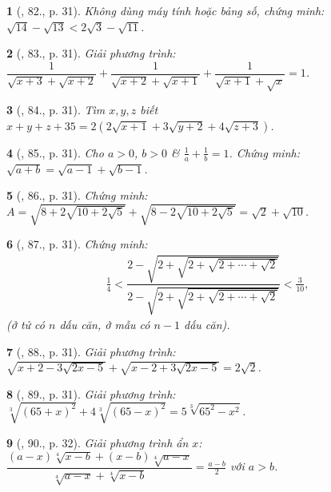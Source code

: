 \documentclass{article}
\newtheorem{baitoan}{}
\begin{document}
\begin{baitoan}[\cite{Tuyen_Toan_9_old}, 82., p. 31]
	Không dùng máy tính hoặc bảng số, chứng minh: $\sqrt{14} - \sqrt{13} < 2\sqrt{3} - \sqrt{11}$.
\end{baitoan}

\begin{baitoan}[\cite{Tuyen_Toan_9_old}, 83., p. 31]
	Giải phương trình: $\dfrac{1}{\sqrt{x + 3} + \sqrt{x + 2}} + \dfrac{1}{\sqrt{x + 2} + \sqrt{x + 1}} + \dfrac{1}{\sqrt{x + 1} + \sqrt{x}} = 1$. 
\end{baitoan}

\begin{baitoan}[\cite{Tuyen_Toan_9_old}, 84., p. 31]
	Tìm $x,y,z$ biết $x + y + z + 35 = 2(2\sqrt{x + 1} + 3\sqrt{y + 2} +4\sqrt{z + 3})$.
\end{baitoan}

\begin{baitoan}[\cite{Tuyen_Toan_9_old}, 85., p. 31]
	Cho $a > 0$, $b > 0$ \& $\frac{1}{a} + \frac{1}{b} = 1$. Chứng minh: $\sqrt{a + b} = \sqrt{a - 1} + \sqrt{b - 1}$.
\end{baitoan}

\begin{baitoan}[\cite{Tuyen_Toan_9_old}, 86., p. 31]
	Chứng minh: $A = \sqrt{8 + 2\sqrt{10 + 2\sqrt{5}}} + \sqrt{8 - 2\sqrt{10 + 2\sqrt{5}}} = \sqrt{2} + \sqrt{10}$.
\end{baitoan}

\begin{baitoan}[\cite{Tuyen_Toan_9_old}, 87., p. 31]
	Chứng minh:
	\begin{align*}
		\frac{1}{4} < \dfrac{2 - \sqrt{2 + \sqrt{2 + \sqrt{2 + \cdots + \sqrt{2}}}}}{2 - \sqrt{2 + \sqrt{2 + \sqrt{2 + \cdots + \sqrt{2}}}}} < \frac{3}{10},
	\end{align*}
	(ở tử có $n$ dấu căn, ở mẫu có $n - 1$ dấu căn).
\end{baitoan}

\begin{baitoan}[\cite{Tuyen_Toan_9_old}, 88., p. 31]
	Giải phương trình: $\sqrt{x + 2 - 3\sqrt{2x - 5}} + \sqrt{x - 2 + 3\sqrt{2x - 5}} = 2\sqrt{2}$.
\end{baitoan}

\begin{baitoan}[\cite{Tuyen_Toan_9_old}, 89., p. 31]
	Giải phương trình: $\sqrt[3]{(65 + x)^2} + 4\sqrt[3]{(65 - x)^2} = 5\sqrt[3]{65^2 - x^2}$.
\end{baitoan}

\begin{baitoan}[\cite{Tuyen_Toan_9_old}, 90., p. 32]
	Giải phương trình ẩn $x$: $\dfrac{(a - x)\sqrt[4]{x - b} + (x - b)\sqrt[4]{a - x}}{\sqrt[4]{a - x} + \sqrt[4]{x - b}} = \frac{a - b}{2}$ với $a > b$.
\end{baitoan}
\end{document}
